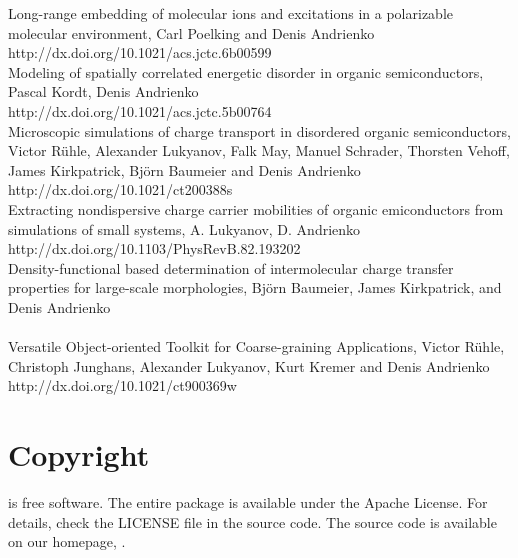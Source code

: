 \vspace{0.1cm}
\noindent
\cite{poelking_long-range_2016} Long-range embedding of molecular ions and excitations in a polarizable molecular environment, Carl Poelking and Denis Andrienko \\
{http://dx.doi.org/10.1021/acs.jctc.6b00599} \\

\vspace{0.1cm}
\noindent
\cite{kordt_modeling_2016} Modeling of spatially correlated energetic disorder in organic semiconductors,
Pascal Kordt, Denis Andrienko \\
{http://dx.doi.org/10.1021/acs.jctc.5b00764} \\

\vspace{0.1cm}
\noindent
\cite{ruhle_microscopic_2011} Microscopic simulations of charge transport in disordered organic semiconductors, 
Victor R\"uhle, Alexander Lukyanov, Falk May, Manuel Schrader, Thorsten Vehoff, James Kirkpatrick, Bj\"orn Baumeier and Denis Andrienko \\
{http://dx.doi.org/10.1021/ct200388s} \\

\vspace{0.1cm}
\noindent
\cite{lukyanov_extracting_2010} Extracting nondispersive charge carrier mobilities of organic emiconductors from simulations of small systems, A. Lukyanov, D. Andrienko \\
{http://dx.doi.org/10.1103/PhysRevB.82.193202} \\

\vspace{0.1cm}
\noindent
\cite{baumeier_density-functional_2010}
      Density-functional based determination of intermolecular charge transfer properties for large-scale morphologies, Bj{\"o}rn Baumeier,  James Kirkpatrick, and Denis Andrienko \\
        \\

\vspace{0.1cm}
\noindent
\cite{ruhle_versatile_2009} Versatile Object-oriented Toolkit for Coarse-graining Applications, 
Victor R\"uhle, Christoph Junghans, Alexander Lukyanov, Kurt Kremer and Denis Andrienko \\
{http://dx.doi.org/10.1021/ct900369w}

\section*{Copyright}
\votcactp is free software. The entire package is available under the Apache License. For details, check
the LICENSE file in the source code. The \votcactp source code is available on our homepage, .

\vfill
